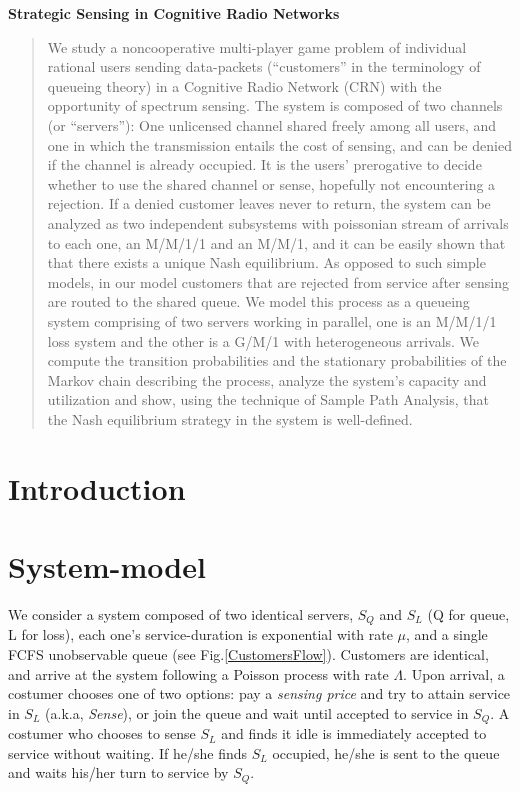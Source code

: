 \documentclass[11pt]{article}
\numberwithin{equation}{section}
\begin{document}
\begin{center} \Large {\bf Strategic Sensing in Cognitive Radio Networks}
\end{center}

\begin{abstract} 

We study a noncooperative multi-player game problem of individual rational users sending data-packets (``customers'' in the terminology of queueing theory) in a Cognitive Radio Network (CRN) with the opportunity of spectrum sensing. The system is composed of two channels (or ``servers''): One unlicensed channel shared freely among all users, and one in which the transmission entails the cost of sensing, and can be denied if the channel is already occupied. It is the users' prerogative to decide whether to use the shared channel or sense, hopefully not encountering a rejection. If a denied customer leaves never to return, the system can be analyzed as two independent subsystems with poissonian stream of arrivals to each one, an M/M/1/1 and an M/M/1, and it can be easily shown that that there exists a unique Nash equilibrium. As opposed to such simple models, in our model customers that are rejected from service after sensing are routed to the shared queue. We model this process as a queueing system comprising of two servers working in parallel, one is an M/M/1/1 loss system and the other is a G/M/1 with heterogeneous arrivals. We compute the transition probabilities and the stationary probabilities of the Markov chain describing the process, analyze the system's capacity and utilization and show, using the technique of Sample Path Analysis, that the Nash equilibrium strategy in the system is well-defined.

\newpage

\end{abstract}

\section{Introduction}

\newpage

\section{System-model}

We consider a system composed of two identical servers, $S_Q$ and $S_L$ (Q for queue, L for loss), each one's service-duration is exponential with rate $\mu$, and a single FCFS unobservable queue (see Fig.\ref{CustomersFlow}). Customers are identical, and arrive at the system following a Poisson process with rate $\Lambda$. Upon arrival, a costumer chooses one of two options: pay a {\it sensing price} and try to attain service in $S_L$ (a.k.a, {\it Sense}), or join the queue and wait until accepted to service in $S_Q$. A costumer who chooses to sense $S_L$ and finds it idle is immediately accepted to service without waiting. If he/she finds $S_L$ occupied, he/she is sent to the queue and waits his/her turn to service by $S_Q$.
\end{document}
